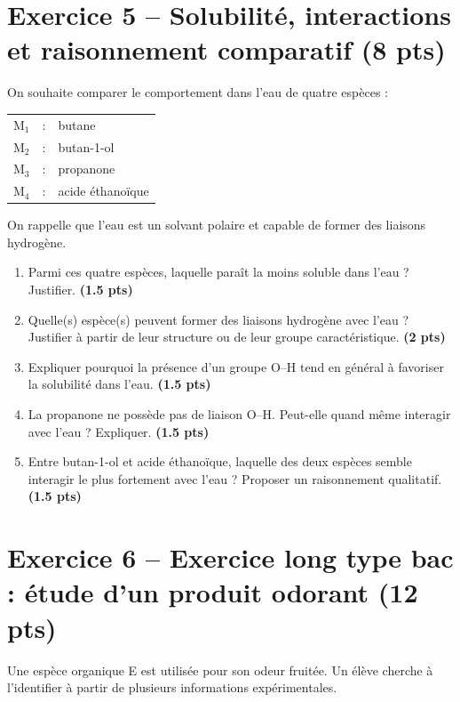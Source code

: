 \documentclass[11pt,a4paper]{article}
\newcommand{\pts}[1]{\hfill{\small\textbf{(#1 pts)}}}
\begin{document}
\section*{Exercice 5 -- Solubilité, interactions et raisonnement comparatif \pts{8}}

On souhaite comparer le comportement dans l'eau de quatre espèces :
\begin{center}
\begin{tabular}{ccl}
M$_1$ & : & butane \\
M$_2$ & : & butan-1-ol \\
M$_3$ & : & propanone \\
M$_4$ & : & acide éthanoïque \\
\end{tabular}
\end{center}

On rappelle que l'eau est un solvant polaire et capable de former des liaisons hydrogène.

\begin{enumerate}[label=\textbf{\arabic*.},leftmargin=1.2em]
    \item Parmi ces quatre espèces, laquelle paraît la moins soluble dans l'eau ? Justifier. \pts{1.5}
    \item Quelle(s) espèce(s) peuvent former des liaisons hydrogène avec l'eau ? Justifier à partir de leur structure ou de leur groupe caractéristique. \pts{2}
    \item Expliquer pourquoi la présence d'un groupe O--H tend en général à favoriser la solubilité dans l'eau. \pts{1.5}
    \item La propanone ne possède pas de liaison O--H. Peut-elle quand même interagir avec l'eau ? Expliquer. \pts{1.5}
    \item Entre butan-1-ol et acide éthanoïque, laquelle des deux espèces semble interagir le plus fortement avec l'eau ? Proposer un raisonnement qualitatif. \pts{1.5}
\end{enumerate}

\newpage
\section*{Exercice 6 -- Exercice long type bac : étude d'un produit odorant \pts{12}}

Une espèce organique E est utilisée pour son odeur fruitée. Un élève cherche à l'identifier à partir de plusieurs informations expérimentales.
\end{document}
